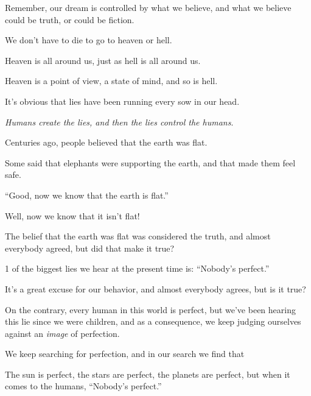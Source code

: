 \documentclass{article}
\numberwithin{equation}{section}
\begin{document}

%
Remember, our dream is controlled by what we believe, and what we believe could be truth, or could be fiction.





We don't have to die to go to heaven or hell.

Heaven is all around us, just as hell is all around us.

Heaven is a point of view, a state of mind, and so is hell.

It's obvious that lies have been running every sow in our head.

\textit{Humans create the lies, and then the lies control the humans}.


%
Centuries ago, people believed that the earth was flat.

Some said that elephants were supporting the earth, and that made them feel safe.

``Good, now we know that the earth is flat.''

Well, now we know that it isn't flat!

The belief that the earth was flat was considered the truth, and almost everybody agreed, but did that make it true?

%
1 of the biggest lies we hear at the present time is: ``Nobody's perfect.''

It's a great excuse for our behavior, and almost everybody agrees, but is it true?

On the contrary, every human in this world is perfect, but we've been hearing this lie since we were children, and as a consequence, we keep judging ourselves against an \textit{image} of perfection.

We keep searching for perfection, and in our search we find that 

The sun is perfect, the stars are perfect, the planets are perfect, but when it comes to the humans, ``Nobody's perfect.''
\end{document}
